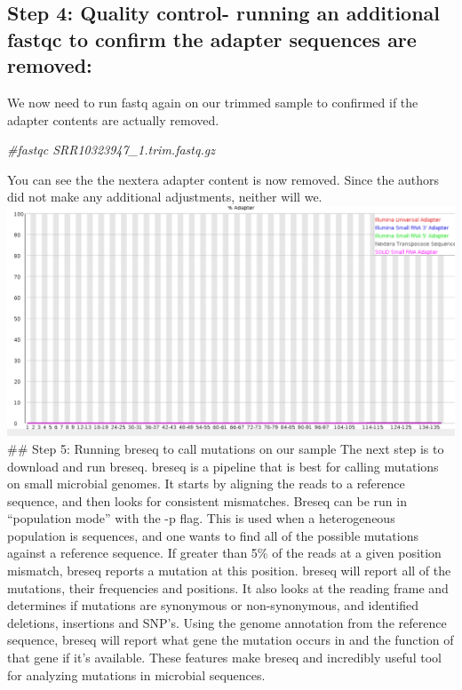 \documentclass[
]{article}
\newenvironment{Shaded}{\begin{snugshade}}{\end{snugshade}}
\newcommand{\CommentTok}[1]{\textcolor[rgb]{0.56,0.35,0.01}{\textit{#1}}}
\begin{document}
\hypertarget{step-4-quality-control--running-an-additional-fastqc-to-confirm-the-adapter-sequences-are-removed}{%
\subsection{Step 4: Quality control- running an additional fastqc to
confirm the adapter sequences are
removed:}\label{step-4-quality-control--running-an-additional-fastqc-to-confirm-the-adapter-sequences-are-removed}}

We now need to run fastq again on our trimmed sample to confirmed if the
adapter contents are actually removed.

\begin{Shaded}
\begin{Highlighting}[]
\CommentTok{#fastqc SRR10323947_1.trim.fastq.gz}
\end{Highlighting}
\end{Shaded}

You can see the the nextera adapter content is now removed. Since the
authors did not make any additional adjustments, neither will we.
\includegraphics{cleaned_adapters.png} \#\# Step 5: Running breseq to
call mutations on our sample The next step is to download and run
breseq. breseq is a pipeline that is best for calling mutations on small
microbial genomes. It starts by aligning the reads to a reference
sequence, and then looks for consistent mismatches. Breseq can be run in
``population mode'' with the -p flag. This is used when a heterogeneous
population is sequences, and one wants to find all of the possible
mutations against a reference sequence. If greater than 5\% of the reads
at a given position mismatch, breseq reports a mutation at this
position. breseq will report all of the mutations, their frequencies and
positions. It also looks at the reading frame and determines if
mutations are synonymous or non-synonymous, and identified deletions,
insertions and SNP's. Using the genome annotation from the reference
sequence, breseq will report what gene the mutation occurs in and the
function of that gene if it's available. These features make breseq and
incredibly useful tool for analyzing mutations in microbial sequences.
\end{document}
